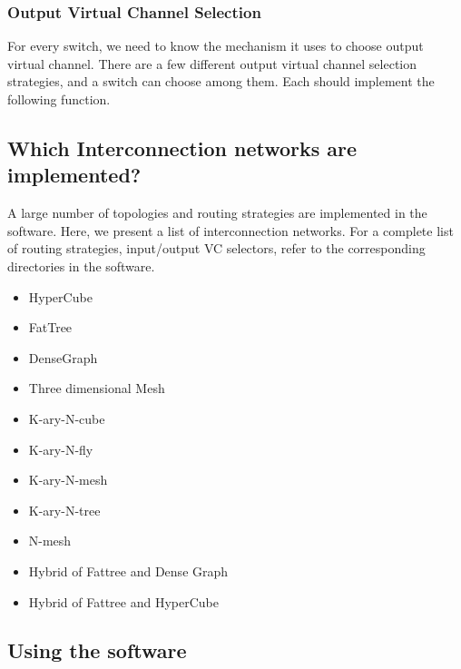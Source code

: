 

\subsubsection{Output Virtual Channel Selection}
For every switch, we need to know the mechanism it uses to choose output virtual channel.
There are a few different output virtual channel selection strategies, and a switch
can choose among them. Each should implement the following function.



\subsection{Which Interconnection networks are implemented?}
A large number of topologies and routing strategies are implemented in the
software. Here, we present a list of interconnection networks. For a complete list of
routing strategies, input/output VC selectors, refer to the corresponding 
directories in the software.
\begin{itemize}
\item HyperCube
\item FatTree
\item DenseGraph
\item Three dimensional Mesh
\item K-ary-N-cube
\item K-ary-N-fly
\item K-ary-N-mesh
\item K-ary-N-tree
\item N-mesh
\item Hybrid of Fattree and Dense Graph
\item Hybrid of Fattree and HyperCube
\end{itemize}


\subsection{Using the software}

